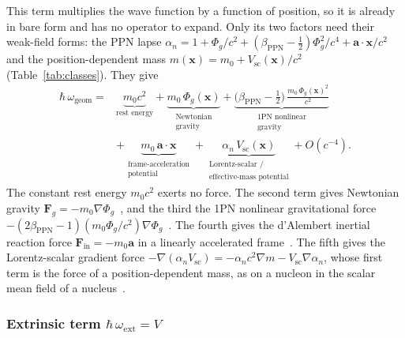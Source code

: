 \documentclass[aps,prd,onecolumn,tightenlines,nofootinbib,notitlepage,11pt,floatfix]{revtex4-2}
\theoremstyle{indentedtheorem}
\begin{document}
This term multiplies the wave function by a function of position, so it is already in bare form and has no operator to expand. Only its two factors need their weak-field forms: the PPN lapse $\alpha_n = 1 + \Phi_g/c^2 + (\beta_\text{PPN}-\tfrac{1}{2})\Phi_g^2/c^4 + \mathbf{a}\cdot\mathbf{x}/c^2$~\citep{Will2014Confrontation,HehlNi1990Inertial} and the position-dependent mass $m(\mathbf{x}) = m_0 + V_\text{sc}(\mathbf{x})/c^2$ (Table~\ref{tab:classes}). They give
\begin{equation}
    \begin{split}\hbar\,\omega_\text{geom} = {}&
    \underbrace{m_0c^2}_{\text{rest energy}}
    + \underbrace{m_0\,\Phi_g(\mathbf{x})}_{\substack{\text{Newtonian} \\ \text{gravity}}}
    + \underbrace{\big(\beta_\text{PPN}-\tfrac{1}{2}\big)\,\frac{m_0\,\Phi_g(\mathbf{x})^2}{c^2}}_{\substack{\text{1PN nonlinear} \\ \text{gravity}}}
    \\ & + \underbrace{m_0\,\mathbf{a}\cdot\mathbf{x}}_{\substack{\text{frame-acceleration} \\ \text{potential}}}
    + \underbrace{\alpha_n\,V_\text{sc}(\mathbf{x})}_{\substack{\text{Lorentz-scalar /} \\ \text{effective-mass potential}}} + O(c^{-4}) .\end{split}
    \label{eq:geom_expanded}
\end{equation}
The constant rest energy $m_0c^2$ exerts no force. The second term gives Newtonian gravity $\mathbf{F}_g = -m_0\nabla\Phi_g$~\citep{Newton1687Philosophiae}, and the third the 1PN nonlinear gravitational force $-(2\beta_\text{PPN}-1)(m_0\Phi_g/c^2)\nabla\Phi_g$~\citep{Einstein1915GR,Will2014Confrontation}. The fourth gives the d'Alembert inertial reaction force $\mathbf{F}_\text{in} = -m_0\mathbf{a}$ in a linearly accelerated frame~\citep{HehlNi1990Inertial}. The fifth gives the Lorentz-scalar gradient force $-\nabla(\alpha_nV_\text{sc}) = -\alpha_n c^2\nabla m - V_\text{sc}\nabla\alpha_n$, whose first term is the force of a position-dependent mass, as on a nucleon in the scalar mean field of a nucleus~\citep{SerotWalecka1986Relativistic}.

\subsubsection{Extrinsic term \texorpdfstring{$\hbar\,\omega_\text{ext}=V$}{hbar omega ext}}
\label{sec:term_ext}
\end{document}
